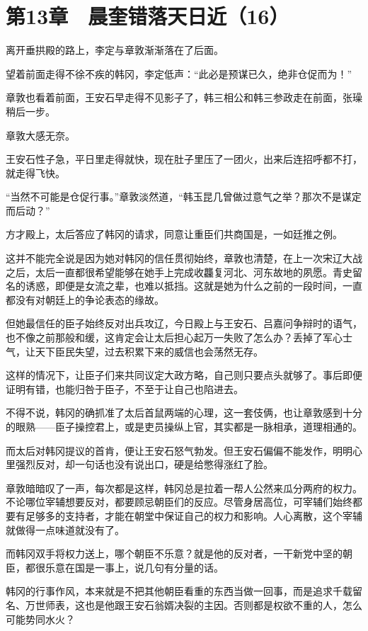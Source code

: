 \section{第13章　晨奎错落天日近（16）}

离开垂拱殿的路上，李定与章敦渐渐落在了后面。

望着前面走得不徐不疾的韩冈，李定低声：“此必是预谋已久，绝非仓促而为！”

章敦也看着前面，王安石早走得不见影子了，韩三相公和韩三参政走在前面，张璪稍后一步。

章敦大感无奈。

王安石性子急，平日里走得就快，现在肚子里压了一团火，出来后连招呼都不打，就走得飞快。

“当然不可能是仓促行事。”章敦淡然道，“韩玉昆几曾做过意气之举？那次不是谋定而后动？”

方才殿上，太后答应了韩冈的请求，同意让重臣们共商国是，一如廷推之例。

这并不能完全说是因为她对韩冈的信任贯彻始终，章敦也清楚，在上一次宋辽大战之后，太后一直都很希望能够在她手上完成收龘复河北、河东故地的夙愿。青史留名的诱惑，即便是女流之辈，也难以抵挡。这就是她为什么之前的一段时间，一直都没有对朝廷上的争论表态的缘故。

但她最信任的臣子始终反对出兵攻辽，今日殿上与王安石、吕嘉问争辩时的语气，也不像之前那般和缓，这肯定会让太后担心起万一失败了怎么办？丢掉了军心士气，让天下臣民失望，过去积累下来的威信也会荡然无存。

这样的情况下，让臣子们来共同议定大政方略，自己则只要点头就够了。事后即便证明有错，也能归咎于臣子，不至于让自己也陷进去。

不得不说，韩冈的确抓准了太后首鼠两端的心理，这一套伎俩，也让章敦感到十分的眼熟——臣子操控君上，或是吏员操纵上官，其实都是一脉相承，道理相通的。

而太后对韩冈提议的首肯，便让王安石怒气勃发。但王安石偏偏不能发作，明明心里强烈反对，却一句话也没有说出口，硬是给憋得涨红了脸。

章敦暗暗叹了一声，每次都是这样，韩冈总是拉着一帮人公然来瓜分两府的权力。不论哪位宰辅想要反对，都要顾忌朝臣们的反应。尽管身居高位，可宰辅们始终都要有足够多的支持者，才能在朝堂中保证自己的权力和影响。人心离散，这个宰辅就做得一点味道就没有了。

而韩冈双手将权力送上，哪个朝臣不乐意？就是他的反对者，一干新党中坚的朝臣，都很乐意在国是一事上，说几句有分量的话。

韩冈的行事作风，本来就是不把其他朝臣看重的东西当做一回事，而是追求千载留名、万世师表，这也是他跟王安石翁婿决裂的主因。否则都是权欲不重的人，怎么可能势同水火？

